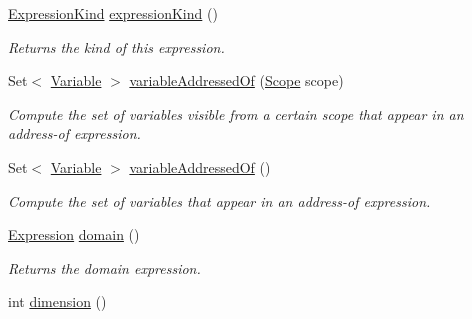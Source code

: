 \begin{DoxyCompactItemize}
\item 
\hyperlink{enumedu_1_1udel_1_1cis_1_1vsl_1_1civl_1_1model_1_1IF_1_1expression_1_1Expression_1_1ExpressionKind}{Expression\+Kind} \hyperlink{classedu_1_1udel_1_1cis_1_1vsl_1_1civl_1_1model_1_1common_1_1expression_1_1CommonDomainGuardExpression_a317da01c43eb6d1aadda8f10f4242fcb}{expression\+Kind} ()
\begin{DoxyCompactList}\small\item\em Returns the kind of this expression. \end{DoxyCompactList}\item 
Set$<$ \hyperlink{interfaceedu_1_1udel_1_1cis_1_1vsl_1_1civl_1_1model_1_1IF_1_1variable_1_1Variable}{Variable} $>$ \hyperlink{classedu_1_1udel_1_1cis_1_1vsl_1_1civl_1_1model_1_1common_1_1expression_1_1CommonDomainGuardExpression_a418c7331215f024cb2f1489d043c1c58}{variable\+Addressed\+Of} (\hyperlink{interfaceedu_1_1udel_1_1cis_1_1vsl_1_1civl_1_1model_1_1IF_1_1Scope}{Scope} scope)
\begin{DoxyCompactList}\small\item\em Compute the set of variables visible from a certain scope that appear in an address-\/of expression. \end{DoxyCompactList}\item 
Set$<$ \hyperlink{interfaceedu_1_1udel_1_1cis_1_1vsl_1_1civl_1_1model_1_1IF_1_1variable_1_1Variable}{Variable} $>$ \hyperlink{classedu_1_1udel_1_1cis_1_1vsl_1_1civl_1_1model_1_1common_1_1expression_1_1CommonDomainGuardExpression_ad35691b6e27cac5779850c37300725af}{variable\+Addressed\+Of} ()
\begin{DoxyCompactList}\small\item\em Compute the set of variables that appear in an address-\/of expression. \end{DoxyCompactList}\item 
\hyperlink{interfaceedu_1_1udel_1_1cis_1_1vsl_1_1civl_1_1model_1_1IF_1_1expression_1_1Expression}{Expression} \hyperlink{classedu_1_1udel_1_1cis_1_1vsl_1_1civl_1_1model_1_1common_1_1expression_1_1CommonDomainGuardExpression_a074be6652b244d13afd2dc9e6d62b42f}{domain} ()
\begin{DoxyCompactList}\small\item\em Returns the domain expression. \end{DoxyCompactList}\item 
int \hyperlink{classedu_1_1udel_1_1cis_1_1vsl_1_1civl_1_1model_1_1common_1_1expression_1_1CommonDomainGuardExpression_ab3f7bf368b27ade90feb3825455f2c0c}{dimension} ()

\end{DoxyCompactItemize}
